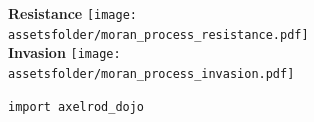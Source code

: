\documentclass{beamer}
\newcommand{\assetsfolder}{./assets}
\newcommand{\mlresearchfolder}{$HOME/rsc/ml-paper}
\begin{document}






\begin{frame}

    \begin{center}
        \textbf{Resistance}
        \texttt{[image: \\assetsfolder/moran\_process\_resistance.pdf]}\\

        \textbf{Invasion}
        \texttt{[image: \\assetsfolder/moran\_process\_invasion.pdf]}
    \end{center}
\end{frame}


\begin{frame}
    \scalebox{.7}{
        
    }
\end{frame}

\begin{frame}[fragile]{}

    \begin{center}
        \begin{minipage}{0.8\textwidth}
            \begin{verbatim}
import axelrod_dojo
            \end{verbatim}
        \end{minipage}
    \end{center}
\end{frame}
\end{document}
